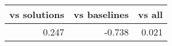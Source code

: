 
\begin{tabular}{ | r | r | r | }
    \hline
          vs solutions  &    vs baselines  &          vs all  \\
    \hline
    \hline
                 0.247  &          -0.738  &           0.021  \\
    \hline
\end{tabular}
